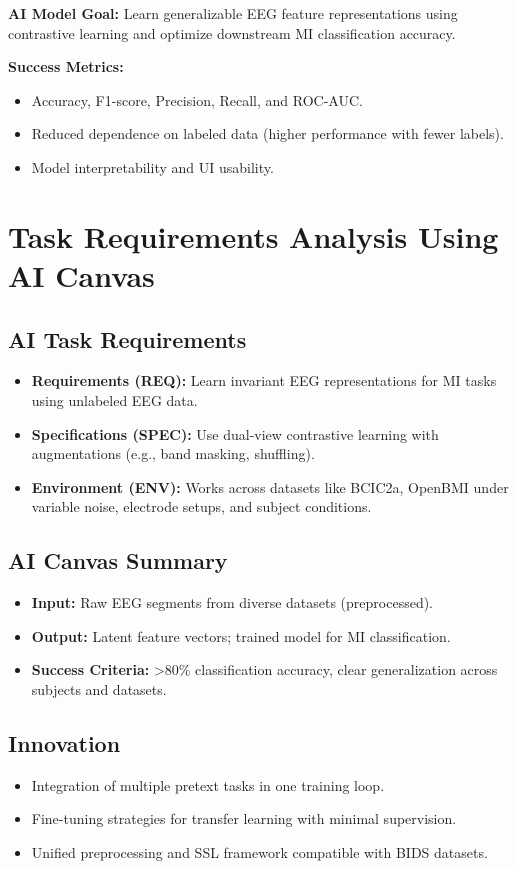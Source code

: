 \textbf{AI Model Goal:} Learn generalizable EEG feature representations using contrastive learning and optimize downstream MI classification accuracy.

\textbf{Success Metrics:}
\begin{itemize}
    \item Accuracy, F1-score, Precision, Recall, and ROC-AUC.
    \item Reduced dependence on labeled data (higher performance with fewer labels).
    \item Model interpretability and UI usability.
\end{itemize}

\section{Task Requirements Analysis Using AI Canvas}
\label{sec:ai-canvas}

\subsection{AI Task Requirements}
\begin{itemize}
    \item \textbf{Requirements (REQ):} Learn invariant EEG representations for MI tasks using unlabeled EEG data.
    \item \textbf{Specifications (SPEC):} Use dual-view contrastive learning with augmentations (e.g., band masking, shuffling).
    \item \textbf{Environment (ENV):} Works across datasets like BCIC2a, OpenBMI under variable noise, electrode setups, and subject conditions.
\end{itemize}

\subsection{AI Canvas Summary}
\begin{itemize}
    \item \textbf{Input:} Raw EEG segments from diverse datasets (preprocessed).
    \item \textbf{Output:} Latent feature vectors; trained model for MI classification.
    \item \textbf{Success Criteria:} >80\% classification accuracy, clear generalization across subjects and datasets.
\end{itemize}

\subsection{Innovation}
\begin{itemize}
    \item Integration of multiple pretext tasks in one training loop.
    \item Fine-tuning strategies for transfer learning with minimal supervision.
    \item Unified preprocessing and SSL framework compatible with BIDS datasets.
\end{itemize}

